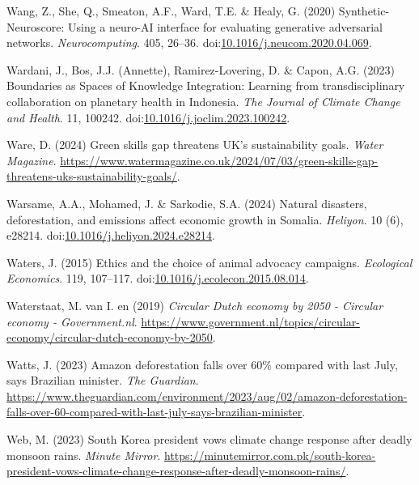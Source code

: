 \documentclass[
  letterpaper,
  DIV=11,
  numbers=noendperiod]{scrartcl}
\newlength{\cslhangindent}
\newenvironment{CSLReferences}[2] %
 {\begin{list}{}{%
  \setlength{\itemindent}{0pt}
  \setlength{\leftmargin}{0pt}
  \setlength{\parsep}{0pt}
  \ifodd #1
   \setlength{\leftmargin}{\cslhangindent}
   \setlength{\itemindent}{-1\cslhangindent}
  \fi
  \setlength{\itemsep}{#2\baselineskip}}}
 {\end{list}}
\begin{document}
\begin{CSLReferences}{0}{1}
Wang, Z., She, Q., Smeaton, A.F., Ward, T.E. \& Healy, G. (2020)
Synthetic-{Neuroscore}: {Using} a neuro-{AI} interface for evaluating
generative adversarial networks. \emph{Neurocomputing}. 405, 26--36.
doi:\href{https://doi.org/10.1016/j.neucom.2020.04.069}{10.1016/j.neucom.2020.04.069}.

Wardani, J., Bos, J.J. (Annette), Ramirez-Lovering, D. \& Capon, A.G.
(2023) Boundaries as {Spaces} of {Knowledge Integration}: {Learning}
from transdisciplinary collaboration on planetary health in {Indonesia}.
\emph{The Journal of Climate Change and Health}. 11, 100242.
doi:\href{https://doi.org/10.1016/j.joclim.2023.100242}{10.1016/j.joclim.2023.100242}.

Ware, D. (2024) Green skills gap threatens {UK}'s sustainability goals.
\emph{Water Magazine}.
\url{https://www.watermagazine.co.uk/2024/07/03/green-skills-gap-threatens-uks-sustainability-goals/}.

Warsame, A.A., Mohamed, J. \& Sarkodie, S.A. (2024) Natural disasters,
deforestation, and emissions affect economic growth in {Somalia}.
\emph{Heliyon}. 10 (6), e28214.
doi:\href{https://doi.org/10.1016/j.heliyon.2024.e28214}{10.1016/j.heliyon.2024.e28214}.

Waters, J. (2015) Ethics and the choice of animal advocacy campaigns.
\emph{Ecological Economics}. 119, 107--117.
doi:\href{https://doi.org/10.1016/j.ecolecon.2015.08.014}{10.1016/j.ecolecon.2015.08.014}.

Waterstaat, M. van I. en (2019) \emph{Circular {Dutch} economy by 2050 -
{Circular} economy - {Government}.nl}.
\url{https://www.government.nl/topics/circular-economy/circular-dutch-economy-by-2050}.

Watts, J. (2023) Amazon deforestation falls over 60\% compared with last
{July}, says {Brazilian} minister. \emph{The Guardian}.
\url{https://www.theguardian.com/environment/2023/aug/02/amazon-deforestation-falls-over-60-compared-with-last-july-says-brazilian-minister}.

Web, M. (2023) South {Korea} president vows climate change response
after deadly monsoon rains. \emph{Minute Mirror}.
\url{https://minutemirror.com.pk/south-korea-president-vows-climate-change-response-after-deadly-monsoon-rains/}.


\end{CSLReferences}
\end{document}
